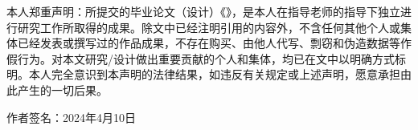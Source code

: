 本人郑重声明：所提交的毕业论文（设计）《\MYTITLE》，是本人在指导老师的指导下独立进行研究工作所取得的成果。除文中已经注明引用的内容外，不含任何其他个人或集体已经发表或撰写过的作品成果，不存在购买、由他人代写、剽窃和伪造数据等作假行为。对本文研究/设计做出重要贡献的个人和集体，均已在文中以明确方式标明。本人完全意识到本声明的法律结果，如违反有关规定或上述声明，愿意承担由此产生的一切后果。

\vspace{66bp}
\noindent 作者签名：\hfill 2024年4月10日